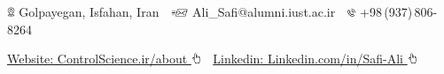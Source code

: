\documentclass[letterpaper,MMMyyyy,nonstopmode]{ResumeTemplate}
\newcommand{\CVAuthor}{Ali Safi}
\begin{document}
\centering
\Title{\CVAuthor} 
\begin{SubTitle}
{\includegraphics[height=8pt]{icons/locations.png} Golpayegan, Isfahan, Iran}
\,\SubBulletSymbol\,
{\includegraphics[height=7pt]{icons/SendEmail.png} Ali\_Safi@alumni.iust.ac.ir}
\,\SubBulletSymbol\,
\includegraphics[height=7pt]{icons/phone1.png}  +98\,(937)\,806-8264
\par
\href{https://www.controlscience.ir/about}{Website: ControlScience.ir/about \includegraphics[height=9pt]{icons/hand-cursor.png}} 
\,\SubBulletSymbol\,
\href{https://www.linkedin.com/in/safi-ali}{Linkedin: Linkedin.com/in/Safi-Ali \includegraphics[height=9pt]{icons/hand-cursor.png}} 
\end{SubTitle}
\end{document}
